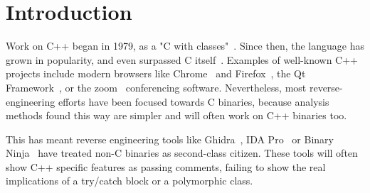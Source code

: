 \documentclass[a4paper,11pt,oneside]{report}
\begin{document}
\maketoc

\chapter{Introduction}





Work on C++ began in 1979, as a "C with classes"~\cite{cwithclasses}.
Since then, the language has grown in popularity, and even surpassed C 
itself~\cite{stackoverflowpopularity}.
Examples of well-known C++ projects include modern browsers like 
Chrome~\cite{chrome} and Firefox~\cite{firefox}, the Qt Framework~\cite{qt}, or 
the zoom~\cite{zoom} conferencing software.
Nevertheless, most reverse-engineering efforts have been focused towards C
binaries, because analysis methods found this way are simpler and will often
work on C++ binaries too.



This has meant reverse engineering tools like Ghidra~\cite{ghidra}, IDA 
Pro~\cite{ida} or Binary Ninja~\cite{binja} have treated non-C binaries as 
second-class citizen.
These tools will often show C++ specific features as passing comments, failing 
to show the real implications of a try/catch block or a polymorphic class.

\end{document}

